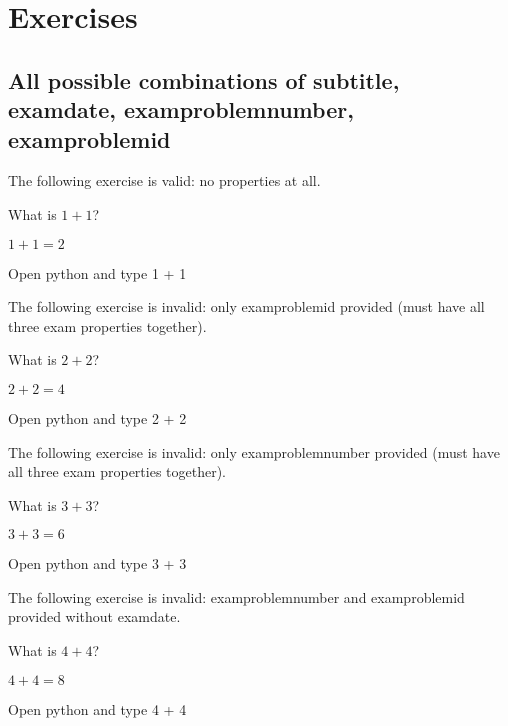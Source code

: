 \documentclass[oneside]{book}
\begin{document}
\chapter{Exercises}

\section{All possible combinations of subtitle, examdate, examproblemnumber, examproblemid}

The following exercise is valid: no properties at all.

\begin{exercise}
  What is \(1 + 1\)?
\end{exercise}
\begin{solution}
  \(1 + 1 = 2\)
\end{solution}
\begin{additionalinformation}
Open python and type 1 + 1
\end{additionalinformation}

The following exercise is invalid: only examproblemid provided (must have all three exam properties together).

\begin{exercise}[examproblemid={2020-01-15-02}]
  What is \(2 + 2\)?
\end{exercise}
\begin{solution}
  \(2 + 2 = 4\)
\end{solution}
\begin{additionalinformation}
Open python and type 2 + 2
\end{additionalinformation}

The following exercise is invalid: only examproblemnumber provided (must have all three exam properties together).

\begin{exercise}[examproblemnumber={3}]
  What is \(3 + 3\)?
\end{exercise}
\begin{solution}
  \(3 + 3 = 6\)
\end{solution}
\begin{additionalinformation}
Open python and type 3 + 3
\end{additionalinformation}

The following exercise is invalid: examproblemnumber and examproblemid provided without examdate.

\begin{exercise}[examproblemnumber={4}, examproblemid={2020-01-15-04}]
  What is \(4 + 4\)?
\end{exercise}
\begin{solution}
  \(4 + 4 = 8\)
\end{solution}
\begin{additionalinformation}
Open python and type 4 + 4
\end{additionalinformation}
\end{document}
